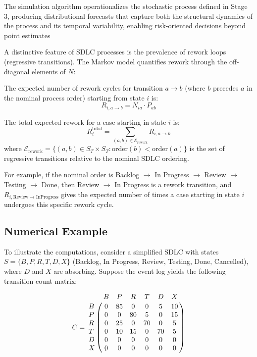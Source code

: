 The simulation algorithm operationalizes the stochastic process defined in Stage 3, producing distributional forecasts that capture both the structural dynamics of the process and its temporal variability, enabling risk-oriented decisions beyond point estimates

A distinctive feature of SDLC processes is the prevalence of rework loops 
(regressive transitions). The Markov model quantifies rework through 
the off-diagonal elements of $N$:

\begin{definition}
\label{def:rework}
The expected number of rework cycles for transition $a \to b$ (where 
$b$ precedes $a$ in the nominal process order) starting from state $i$ 
is:
\begin{equation}
\label{eq:rework-intensity}
R_{i,a \to b} = N_{ia} \cdot P_{ab}
\end{equation}

The total expected rework for a case starting in state $i$ is:
\begin{equation}
\label{eq:total-rework}
R_i^{\text{total}} = \sum_{(a,b) \in \mathcal{E}_{\text{rework}}} R_{i,a \to b}
\end{equation}
where $\mathcal{E}_{\text{rework}} = \{(a, b) \in S_T \times S_T : 
\text{order}(b) < \text{order}(a)\}$ is the set of regressive transitions 
relative to the nominal SDLC ordering.
\end{definition}

For example, if the nominal order is Backlog $\to$ In Progress $\to$ 
Review $\to$ Testing $\to$ Done, then Review $\to$ In Progress is a 
rework transition, and $R_{i, \text{Review} \to \text{InProgress}}$ gives 
the expected number of times a case starting in state $i$ undergoes this 
specific rework cycle.


\subsection{Numerical Example}
\label{sec:s3-example}

To illustrate the computations, consider a simplified SDLC with states 
$S = \{B, P, R, T, D, X\}$ (Backlog, In Progress, Review, Testing, Done, 
Cancelled), where $D$ and $X$ are absorbing. Suppose the event log yields 
the following transition count matrix:

\begin{equation}
\label{eq:example-counts}
C = \bordermatrix{
    & B & P & R & T & D & X \cr
  B & 0 & 85 & 0 & 0 & 5 & 10 \cr
  P & 0 & 0 & 80 & 5 & 0 & 15 \cr
  R & 0 & 25 & 0 & 70 & 0 & 5 \cr
  T & 0 & 10 & 15 & 0 & 70 & 5 \cr
  D & 0 & 0 & 0 & 0 & 0 & 0 \cr
  X & 0 & 0 & 0 & 0 & 0 & 0 \cr
}
\end{equation}

